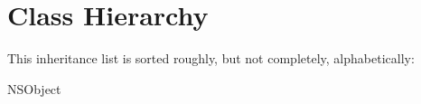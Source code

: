\section{Class Hierarchy}
This inheritance list is sorted roughly, but not completely, alphabetically\-:\begin{DoxyCompactList}
\item N\-S\-Object\begin{DoxyCompactList}
\item {}
\item {}
\end{DoxyCompactList}
\end{DoxyCompactList}
